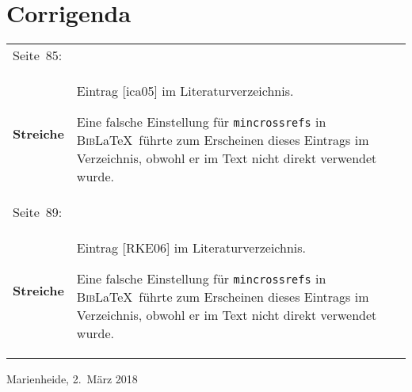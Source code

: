 \documentclass[a5paper,draft,headings=small,DIV=16]{scrreprt}
\newcommand{\errataentrysep}{\vspace{1ex}}
\newcommand{\errataparsep}{\vspace{1ex}}
\newcommand{\BibLaTex}{\textsc{Bib}\LaTeX}
\newcommand{\reasonmincrossrefs}{
Eine falsche Einstellung für \texttt{\small mincrossrefs} in \BibLaTex\
führte zum Erscheinen dieses Eintrags im Verzeichnis, obwohl er im Text
nicht direkt verwendet wurde.}
\begin{document}
\chapter*{Corrigenda}
\thispagestyle{empty}
\begin{tabular}{@{}lp{10cm}@{}}


Seite~85: &  \\
\textbf{Streiche} & Eintrag [ica05] im Literaturverzeichnis. \errataparsep

\reasonmincrossrefs
\errataentrysep\\


Seite~89: &  \\
\textbf{Streiche} & Eintrag [RKE06] im Literaturverzeichnis. \errataparsep

\reasonmincrossrefs
\errataentrysep\\


\end{tabular}

\vspace{1em}
\noindent Marienheide, 2.~März 2018
\end{document}
